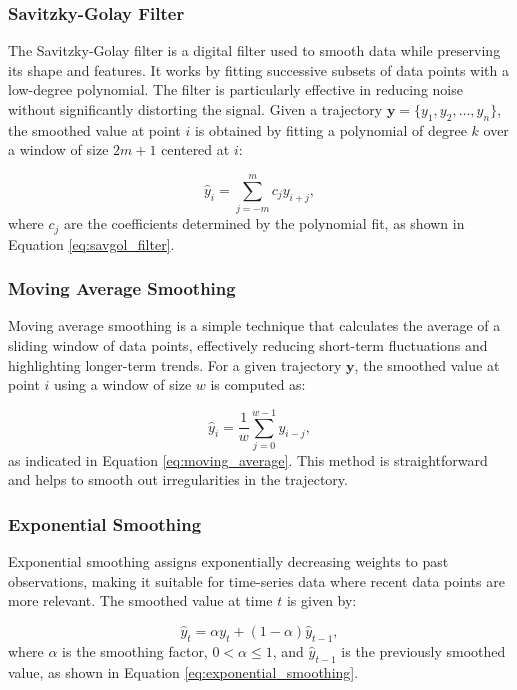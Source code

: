 \documentclass[12pt,oneside]{book} %
\begin{document}
\subsubsection*{Savitzky-Golay Filter}
\noindent The Savitzky-Golay filter is a digital filter used to smooth data while preserving its shape and features. It works by fitting successive subsets of data points with a low-degree polynomial. The filter is particularly effective in reducing noise without significantly distorting the signal. Given a trajectory $\mathbf{y} = \{y_1, y_2, \ldots, y_n\}$, the smoothed value at point $i$ is obtained by fitting a polynomial of degree $k$ over a window of size $2m + 1$ centered at $i$:

\begin{equation}
    \hat{y}_i = \sum_{j=-m}^{m} c_j y_{i+j}, \label{eq:savgol_filter}
\end{equation}
where $c_j$ are the coefficients determined by the polynomial fit, as shown in Equation \eqref{eq:savgol_filter}.

\subsubsection*{Moving Average Smoothing}
\noindent Moving average smoothing is a simple technique that calculates the average of a sliding window of data points, effectively reducing short-term fluctuations and highlighting longer-term trends. For a given trajectory $\mathbf{y}$, the smoothed value at point $i$ using a window of size $w$ is computed as:

\begin{equation}
    \hat{y}_i = \frac{1}{w} \sum_{j=0}^{w-1} y_{i-j}, \label{eq:moving_average}
\end{equation}
as indicated in Equation \eqref{eq:moving_average}. This method is straightforward and helps to smooth out irregularities in the trajectory.

\subsubsection*{Exponential Smoothing}
\noindent Exponential smoothing assigns exponentially decreasing weights to past observations, making it suitable for time-series data where recent data points are more relevant. The smoothed value at time $t$ is given by:

\begin{equation}
    \hat{y}_t = \alpha y_t + (1 - \alpha) \hat{y}_{t-1}, \label{eq:exponential_smoothing}
\end{equation}
where $\alpha$ is the smoothing factor, $0 < \alpha \leq 1$, and $\hat{y}_{t-1}$ is the previously smoothed value, as shown in Equation \eqref{eq:exponential_smoothing}.
\end{document}
